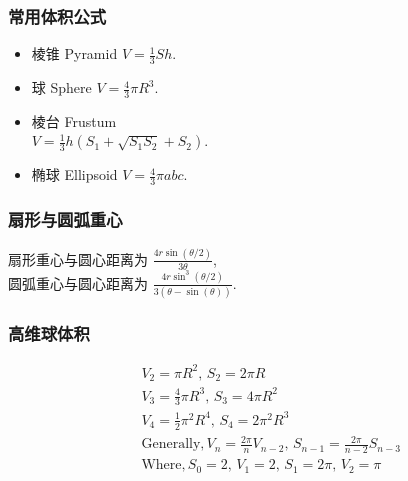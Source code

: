 \begin{small}
\begin{spacing}{0.5}
\begin{multicols*}{2}
\subsubsection{常用体积公式}
\begin{itemize}
\item 棱锥 Pyramid $V=\frac{1}{3}Sh$.
\item 球 Sphere $V=\frac{4}{3}\pi R^3$.
\item 棱台 Frustum \\ $V=\frac{1}{3}h(S_1+\sqrt {S_1S_2}+S_2)$.
\item 椭球 Ellipsoid $V=\frac{4}{3} \pi abc$.
\end{itemize}
\subsubsection{扇形与圆弧重心}
扇形重心与圆心距离为 $\frac{4r\sin(\theta/2)}{3\theta}$,\\
圆弧重心与圆心距离为 $\frac{4r\sin^3(\theta/2)}{3(\theta-\sin(\theta))}$.
\end{multicols*}
\subsubsection{高维球体积}
\begin{eqnarray*}
&& V_2=\pi R^2,\, S_2=2\pi R \\
&& V_3=\frac{4}{3}\pi R^3,\, S_3=4\pi R^2 \\
&& V_4=\frac{1}{2}\pi ^2 R^4,\, S_4=2\pi ^2 R^3 \\
&& \mathrm{Generally}, V_n=\frac{2\pi}{n}V_{n-2},\, S_{n-1}=\frac{2\pi}{n-2}S_{n-3} \\
&& \mathrm{Where}, S_0=2,\, V_1=2,\, S_1=2\pi ,\, V_2=\pi
\end{eqnarray*}
\end{spacing}
\end{small}